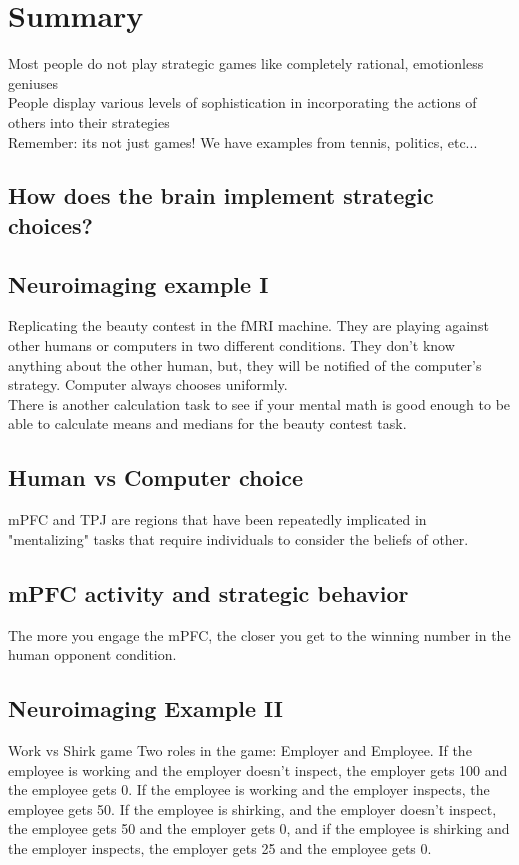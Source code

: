 \section{Summary}
Most people do not play strategic games like completely rational, emotionless geniuses
\\People display various levels of sophistication in incorporating the actions of others into their strategies
\\Remember: its not just games! We have examples from tennis, politics, etc...
\subsection{How does the brain implement strategic choices?}
\subsection{Neuroimaging example I}
Replicating the beauty contest in the fMRI machine. They are playing against other humans or computers in two different conditions. They don't know anything about the other human, but, they will be notified of the computer's strategy. Computer always chooses uniformly.
\\There is another calculation task to see if your mental math is good enough to be able to calculate means and medians for the beauty contest task.

\subsection{Human vs Computer choice}
mPFC and TPJ are regions that have been repeatedly implicated in "mentalizing" tasks that require individuals to consider the beliefs of other.
\subsection{mPFC activity and strategic behavior}
The more you engage the mPFC, the closer you get to the winning number in the human opponent condition.
\subsection{Neuroimaging Example II}
Work vs Shirk game
Two roles in the game: Employer and Employee. If the employee is working and the employer doesn't inspect, the employer gets 100 and the employee gets 0. If the employee is working and the employer inspects, the employee gets 50. If the employee is shirking, and the employer doesn't inspect, the employee gets 50 and the employer gets 0, and if the employee is shirking and the employer inspects, the employer gets 25 and the employee gets 0.
